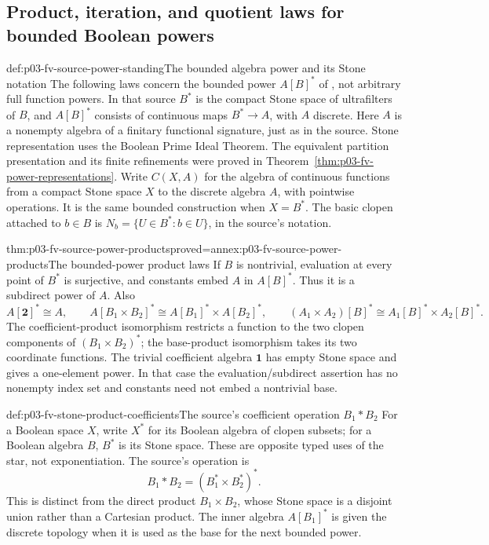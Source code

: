 \subsection{Product, iteration, and quotient laws for bounded Boolean powers}

\begin{hbconvention}{def:p03-fv-source-power-standing}{The bounded algebra power and its Stone notation}
The following laws concern the bounded power \(A[B]^*\) of
\cite[IV\S5, Theorem~5.4 and Exercises~1--3, pp.~141--145]{BurrisSankappanavar2012},
not arbitrary full function powers. In that source \(B^*\) is the compact
Stone space of ultrafilters of \(B\), and \(A[B]^*\) consists of
continuous maps \(B^*\to A\), with \(A\) discrete. Here \(A\)
is a nonempty algebra of a finitary functional signature, just as in the
source. Stone representation uses the Boolean Prime Ideal Theorem.
The equivalent partition presentation and its finite refinements were
proved in Theorem~\ref{thm:p03-fv-power-representations}.
Write \(C(X,A)\) for the algebra of continuous functions from a compact
Stone space \(X\) to the discrete algebra \(A\), with pointwise operations.
It is the same bounded construction when \(X=B^*\).
The basic clopen attached to \(b\in B\) is
\(N_b=\{U\in B^*:b\in U\}\), in the source's notation.
\end{hbconvention}

\begin{hbtheorem}{thm:p03-fv-source-power-products}{proved=annex:p03-fv-source-power-products}{The bounded-power product laws}
If \(B\) is nontrivial, evaluation at every point of \(B^*\) is
surjective, and constants embed \(A\) in \(A[B]^*\). Thus it is
a subdirect power of \(A\). Also
\[
 A[\mathbf 2]^*\cong A,
 \qquad
 A[B_1\times B_2]^*\cong A[B_1]^*\times A[B_2]^*,
 \qquad
 (A_1\times A_2)[B]^*\cong A_1[B]^*\times A_2[B]^*.
\]
The coefficient-product isomorphism restricts a function to the two
clopen components of \((B_1\times B_2)^*\); the base-product
isomorphism takes its two coordinate functions. The trivial coefficient
algebra \(\mathbf1\) has empty Stone space and gives a one-element
power. In that case the evaluation/subdirect assertion has no nonempty
index set and constants need not embed a nontrivial base.
\end{hbtheorem}

\begin{hbdefinition}{def:p03-fv-stone-product-coefficients}{The source's coefficient operation \(B_1*B_2\)}
For a Boolean space \(X\), write \(X^*\) for its Boolean algebra of
clopen subsets; for a Boolean algebra \(B\), \(B^*\) is its Stone
space. These are opposite typed uses of the star, not exponentiation.
The source's operation is
\[
                 B_1*B_2=(B_1^*\times B_2^*)^*.
\]
This is distinct from the direct product \(B_1\times B_2\), whose
Stone space is a disjoint union rather than a Cartesian product.
The inner algebra \(A[B_1]^*\) is given the discrete topology when
it is used as the base for the next bounded power.
\end{hbdefinition}


